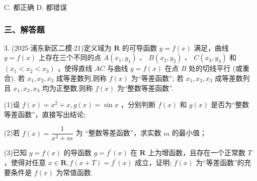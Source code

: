 C.     都正确 D.     都错误

\subsubsection*{三、解答题}

3. (2025$\cdot$浦东新区二模$\cdot$21)定义域为 $\mathbf{R}$ 的可导函数 $y = f\left( x\right)$ 满足，曲线 $y = f\left( x\right)$ 上存在三个不同的点 $A\left( {{x}_{1},{y}_{1}}\right)$ 、 $B\left( {{x}_{2},{y}_{2}}\right)$ 、 $C\left( {{x}_{3},{y}_{3}}\right)$ 和 $\left( {{x}_{1} < {x}_{2} < {x}_{3}}\right)$ ，使得直线 ${AC}$ 与曲线 $y = f\left( x\right)$ 在点 $B$ 处的切线平行 (或重合). 若 ${x}_{1},{x}_{2},{x}_{3}$ 成等差数列,则称 $f\left( x\right)$ 为“等差函数”; 若 ${x}_{1},{x}_{2},{x}_{3}$ 成等差数列且 ${x}_{1},{x}_{2},{x}_{3}$ 均为正整数,则称 $f\left( x\right)$ 为“整数等差函数”.

(1)设 $f\left( x\right)  = {x}^{2} + x,g\left( x\right)  = \sin x$ ，分别判断 $f\left( x\right)$ 和 $g\left( x\right)$ 是否为“整数等差函数”，直接写出结论;

(2)若 $f\left( x\right)  = \dfrac{1}{{x}^{2} + m}$ 为 “整数等差函数”，求实数 $m$ 的最小值；

(3)已知 $y = f\left( x\right)$ 的导函数 $y = {f}^{\prime }\left( x\right)$ 在 $\mathbf{R}$ 上为增函数，且存在一个正常数 $T$ ，使得对任意 $x \in  \mathbf{R},f\left( {x + T}\right)  = {f}^{\prime }\left( x\right)$ 成立，证明: $f\left( x\right)$ 为“等差函数”的充要条件是 $f\left( x\right)$ 为常值函数.